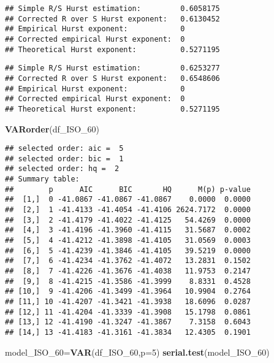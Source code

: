 \documentclass[
]{article}
\newenvironment{Shaded}{\begin{snugshade}}{\end{snugshade}}
\newcommand{\AttributeTok}[1]{\textcolor[rgb]{0.13,0.29,0.53}{#1}}
\newcommand{\DecValTok}[1]{\textcolor[rgb]{0.00,0.00,0.81}{#1}}
\newcommand{\FunctionTok}[1]{\textcolor[rgb]{0.13,0.29,0.53}{\textbf{#1}}}
\newcommand{\NormalTok}[1]{#1}
\newcommand{\OtherTok}[1]{\textcolor[rgb]{0.56,0.35,0.01}{#1}}
\newcommand{\SpecialCharTok}[1]{\textcolor[rgb]{0.81,0.36,0.00}{\textbf{#1}}}
\begin{document}
\begin{verbatim}
## Simple R/S Hurst estimation:         0.6058175 
## Corrected R over S Hurst exponent:   0.6130452 
## Empirical Hurst exponent:            0 
## Corrected empirical Hurst exponent:  0 
## Theoretical Hurst exponent:          0.5271195
\end{verbatim}

\begin{Shaded}
\end{Shaded}

\begin{verbatim}
## Simple R/S Hurst estimation:         0.6253277 
## Corrected R over S Hurst exponent:   0.6548606 
## Empirical Hurst exponent:            0 
## Corrected empirical Hurst exponent:  0 
## Theoretical Hurst exponent:          0.5271195
\end{verbatim}

\begin{Shaded}
\begin{Highlighting}[]
\FunctionTok{VARorder}\NormalTok{(df\_ISO\_60)}
\end{Highlighting}
\end{Shaded}

\begin{verbatim}
## selected order: aic =  5 
## selected order: bic =  1 
## selected order: hq =  2 
## Summary table:  
##        p      AIC      BIC       HQ      M(p) p-value
##  [1,]  0 -41.0867 -41.0867 -41.0867    0.0000  0.0000
##  [2,]  1 -41.4133 -41.4054 -41.4106 2624.7172  0.0000
##  [3,]  2 -41.4179 -41.4022 -41.4125   54.4269  0.0000
##  [4,]  3 -41.4196 -41.3960 -41.4115   31.5687  0.0002
##  [5,]  4 -41.4212 -41.3898 -41.4105   31.0569  0.0003
##  [6,]  5 -41.4239 -41.3846 -41.4105   39.5219  0.0000
##  [7,]  6 -41.4234 -41.3762 -41.4072   13.2831  0.1502
##  [8,]  7 -41.4226 -41.3676 -41.4038   11.9753  0.2147
##  [9,]  8 -41.4215 -41.3586 -41.3999    8.8331  0.4528
## [10,]  9 -41.4206 -41.3499 -41.3964   10.9904  0.2764
## [11,] 10 -41.4207 -41.3421 -41.3938   18.6096  0.0287
## [12,] 11 -41.4204 -41.3339 -41.3908   15.1798  0.0861
## [13,] 12 -41.4190 -41.3247 -41.3867    7.3158  0.6043
## [14,] 13 -41.4183 -41.3161 -41.3834   12.4305  0.1901
\end{verbatim}

\begin{Shaded}
\begin{Highlighting}[]
\NormalTok{model\_ISO\_60}\OtherTok{=}\FunctionTok{VAR}\NormalTok{(df\_ISO\_60,}\AttributeTok{p=}\DecValTok{5}\NormalTok{)}
\FunctionTok{serial.test}\NormalTok{(model\_ISO\_60)}
\end{Highlighting}
\end{Shaded}
\end{document}
